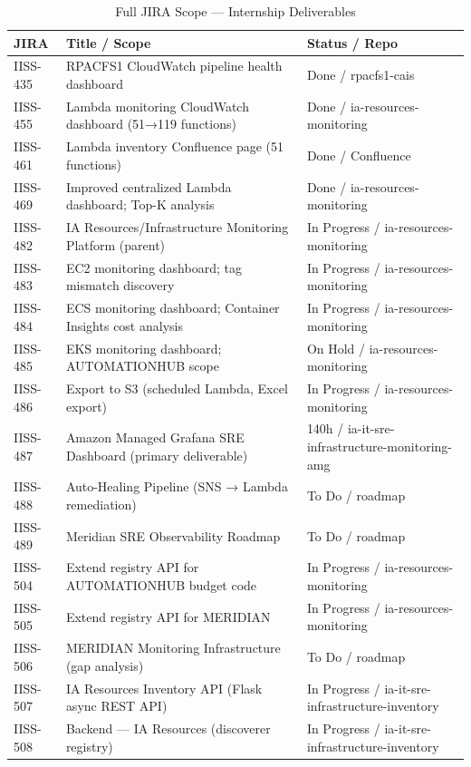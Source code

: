 \begin{table}[ht]
\centering
\caption{Full JIRA Scope --- Internship Deliverables}
\label{tab:full_jira_scope}
\begin{tabular}{p{1.8cm}p{5.5cm}p{4.5cm}}
\toprule
\textbf{JIRA} & \textbf{Title / Scope} & \textbf{Status / Repo} \\
\midrule
IISS-435  & RPACFS1 CloudWatch pipeline health dashboard & Done / rpacfs1-cais \\
IISS-455  & Lambda monitoring CloudWatch dashboard (51→119 functions) & Done / ia-resources-monitoring \\
IISS-461  & Lambda inventory Confluence page (51 functions) & Done / Confluence \\
IISS-469  & Improved centralized Lambda dashboard; Top-K analysis & Done / ia-resources-monitoring \\
IISS-482  & IA Resources/Infrastructure Monitoring Platform (parent) & In Progress / ia-resources-monitoring \\
IISS-483  & EC2 monitoring dashboard; tag mismatch discovery & In Progress / ia-resources-monitoring \\
IISS-484  & ECS monitoring dashboard; Container Insights cost analysis & In Progress / ia-resources-monitoring \\
IISS-485  & EKS monitoring dashboard; AUTOMATIONHUB scope & On Hold / ia-resources-monitoring \\
IISS-486  & Export to S3 (scheduled Lambda, Excel export) & In Progress / ia-resources-monitoring \\
IISS-487  & Amazon Managed Grafana SRE Dashboard (primary deliverable) & 140h / ia-it-sre-infrastructure-monitoring-amg \\
IISS-488  & Auto-Healing Pipeline (SNS → Lambda remediation) & To Do / roadmap \\
IISS-489  & Meridian SRE Observability Roadmap & To Do / roadmap \\
IISS-504  & Extend registry API for AUTOMATIONHUB budget code & In Progress / ia-resources-monitoring \\
IISS-505  & Extend registry API for MERIDIAN & In Progress / ia-resources-monitoring \\
IISS-506  & MERIDIAN Monitoring Infrastructure (gap analysis) & To Do / roadmap \\
IISS-507  & IA Resources Inventory API (Flask async REST API) & In Progress / ia-it-sre-infrastructure-inventory \\
IISS-508  & Backend --- IA Resources (discoverer registry) & In Progress / ia-it-sre-infrastructure-inventory \\

\end{tabular}
\end{table}
